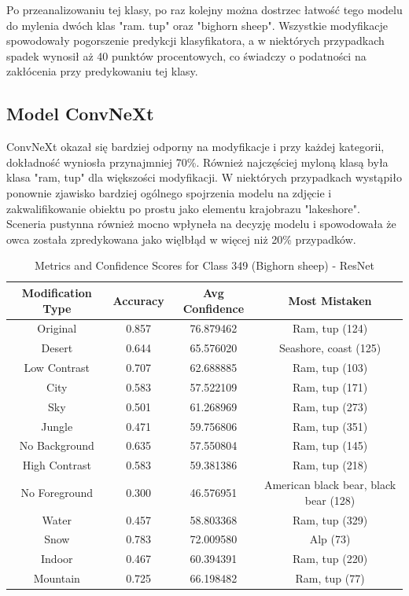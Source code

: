 Po przeanalizowaniu tej klasy, po raz kolejny można dostrzec łatwość tego modelu do mylenia dwóch klas "ram. tup" oraz "bighorn sheep". Wszystkie modyfikacje spowodowały pogorszenie predykcji klasyfikatora, a w niektórych przypadkach spadek wynosił aż 40 punktów procentowych, co świadczy o 
podatności na zakłócenia przy predykowaniu tej klasy.

\subsection*{Model ConvNeXt}

ConvNeXt okazał się bardziej odporny na modyfikacje i przy każdej kategorii, dokładność wyniosła przynajmniej 70\%. Również najczęściej myloną klasą była klasa "ram, tup" dla większości modyfikacji. W niektórych przypadkach wystąpiło ponownie zjawisko bardziej ogólnego spojrzenia modelu
na zdjęcie i zakwalifikowanie obiektu po prostu jako elementu krajobrazu "lakeshore". Sceneria pustynna również mocno wpłyneła na decyzję modelu i spowodowała że owca została zpredykowana jako więlbłąd w więcej niż 20\% przypadków.

\begin{table}
	\centering
	\begin{tabular}{|c|c|c|c|}
		\hline
		\textbf{Modification Type} & \textbf{Accuracy} & \textbf{Avg Confidence} & \textbf{Most Mistaken} \\
		\hline
		Original & 0.857 & 76.879462 & Ram, tup (124) \\
		\hline
		Desert & 0.644 & 65.576020 & Seashore, coast (125) \\
		\hline
		Low Contrast & 0.707 & 62.688885 & Ram, tup (103) \\
		\hline
		City & 0.583 & 57.522109 & Ram, tup (171) \\
		\hline
		Sky & 0.501 & 61.268969 & Ram, tup (273) \\
		\hline
		Jungle & 0.471 & 59.756806 & Ram, tup (351) \\
		\hline
		No Background & 0.635 & 57.550804 & Ram, tup (145) \\
		\hline
		High Contrast & 0.583 & 59.381386 & Ram, tup (218) \\
		\hline
		No Foreground & 0.300 & 46.576951 & American black bear, black bear (128) \\
		\hline
		Water & 0.457 & 58.803368 & Ram, tup (329) \\
		\hline
		Snow & 0.783 & 72.009580 & Alp (73) \\
		\hline
		Indoor & 0.467 & 60.394391 & Ram, tup (220) \\
		\hline
		Mountain & 0.725 & 66.198482 & Ram, tup (77) \\
		\hline
	\end{tabular}
	\caption{Metrics and Confidence Scores for Class 349 (Bighorn sheep) - ResNet}
	\label{tab:metrics_confidence_class_349_resnet}
\end{table}

